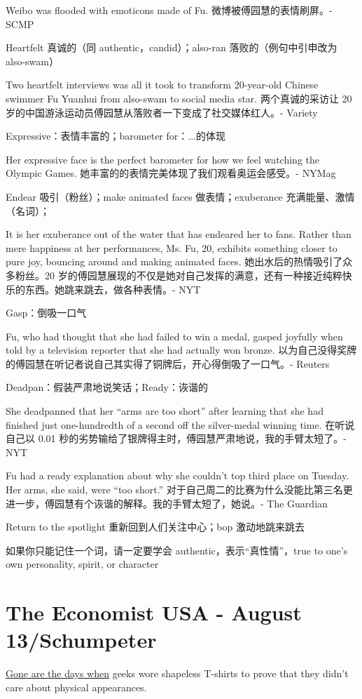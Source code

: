 \documentclass[UTF8]{ctexart}
\begin{document}
Weibo was flooded with emoticons made of Fu. 微博被傅园慧的表情刷屏。- SCMP

Heartfelt 真诚的（同 authentic，candid）；also-ran 落败的（例句中引申改为 also-swam）

Two heartfelt interviews was all it took to transform 20-year-old Chinese swimmer Fu Yuanhui from also-swam to social media star. 两个真诚的采访让 20 岁的中国游泳运动员傅园慧从落败者一下变成了社交媒体红人。- Variety

Expressive：表情丰富的；barometer for：...的体现

Her expressive face is the perfect barometer for how we feel watching the Olympic Games. 她丰富的的表情完美体现了我们观看奥运会感受。- NYMag

Endear 吸引（粉丝）；make animated faces 做表情；exuberance 充满能量、激情（名词）；

It is her exuberance out of the water that has endeared her to fans. Rather than mere happiness at her performances, Ms. Fu, 20, exhibits something closer to pure joy, bouncing around and making animated faces. 她出水后的热情吸引了众多粉丝。20 岁的傅园慧展现的不仅是她对自己发挥的满意，还有一种接近纯粹快乐的东西。她跳来跳去，做各种表情。- NYT

Gasp：倒吸一口气

Fu, who had thought that she had failed to win a medal, gasped joyfully when told by a television reporter that she had actually won bronze. 以为自己没得奖牌的傅园慧在听记者说自己其实得了铜牌后，开心得倒吸了一口气。- Reuters

Deadpan：假装严肃地说笑话；Ready：诙谐的

She deadpanned that her “arms are too short” after learning that she had finished just one-hundredth of a second off the silver-medal winning time. 在听说自己以 0.01 秒的劣势输给了银牌得主时，傅园慧严肃地说，我的手臂太短了。- NYT

Fu had a ready explanation about why she couldn’t top third place on Tuesday. Her arms, she said, were “too short.” 对于自己周二的比赛为什么没能比第三名更进一步，傅园慧有个诙谐的解释。我的手臂太短了，她说。- The Guardian

Return to the spotlight 重新回到人们关注中心；bop 激动地跳来跳去

如果你只能记住一个词，请一定要学会 authentic，表示“真性情”，true to one's own personality, spirit, or character

\section{The Economist USA - August 13/Schumpeter}
\underline{Gone are the days when} geeks wore shapeless T-shirts to prove that they didn’t care about physical appearances.
\end{document}
